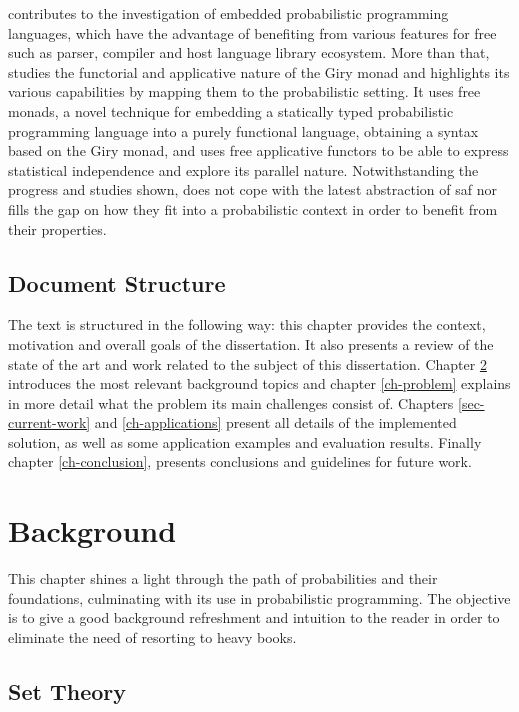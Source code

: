 \documentclass[
  oneside,
  11pt, a4paper,
  footinclude=true,
  headinclude=true,
  cleardoublepage=empty
]{scrbook}
\theoremstyle{definition}
\theoremstyle{definition}
\begin{document}
        \cite{jtobin} contributes to the investigation of embedded probabilistic programming languages, which have the advantage of benefiting from various features for free such as parser, compiler and host language library ecosystem. More than that, \cite{jtobin} studies the functorial and applicative nature of the Giry monad and highlights its various capabilities by mapping them to the probabilistic setting. It uses free monads, a novel technique for embedding a statically typed probabilistic programming language into a purely functional language, obtaining a syntax based on the Giry monad, and uses free applicative functors to be able to express statistical independence and explore its parallel nature. Notwithstanding the progress and studies shown, \cite{jtobin} does not cope with the latest abstraction of \gls{saf} nor fills the gap on how they fit into a probabilistic context in order to benefit from their properties.
        
    \section{Document Structure}
    
    The text is structured in the following way: this chapter provides the context, motivation and overall goals of the dissertation. It also presents a review of the state of the art and work related to the subject of this dissertation. Chapter \ref{ch-background} introduces the most relevant background topics and chapter \ref{ch-problem} explains in more detail what the problem its main challenges consist of. Chapters \ref{sec-current-work} and \ref{ch-applications} present all details of the implemented solution, as well as some application examples and evaluation results. Finally chapter \ref{ch-conclusion}, presents conclusions and guidelines for future work.
    
    \chapter{Background}\label{ch-background}
    
        This chapter shines a light through the path of probabilities and their foundations, culminating with its use in probabilistic programming. The objective is to give a good background refreshment and intuition to the reader in order to eliminate the need of resorting to heavy books.
        
        \section{Set Theory}
        
\end{document}

